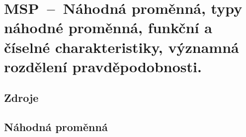 

\graphicspath{{msp/nahodna_promenna/figures}}


\chapter{MSP~--~Náhodná proměnná, typy náhodné proměnná, funkční a číselné charakteristiky, významná rozdělení pravděpodobnosti.}


\section{Zdroje}

\begin{compactitem}
    \item {}
    \item {}
\end{compactitem}


\section{Náhodná proměnná}


